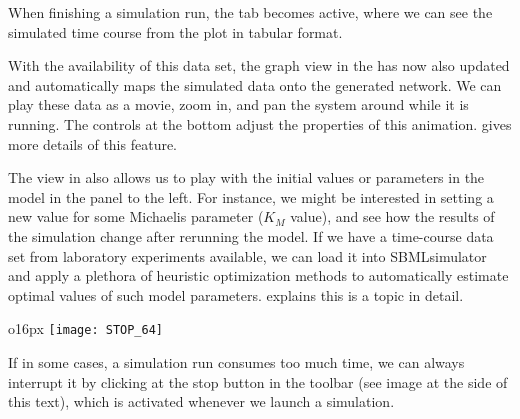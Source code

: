 When finishing a simulation run, the tab  becomes active, where we can see the simulated time course from the plot in tabular format.

With the availability of this data set, the graph view in the  has now also updated and automatically maps the simulated data onto the generated network.
We can play these data as a movie, zoom in, and pan the system around while it is running.
The controls at the bottom adjust the properties of this animation.
 gives more details of this feature.

The view in  also allows us to play with the initial values or parameters in the model in the panel to the left.
For instance, we might be interested in setting a new value for some Michaelis parameter ($K_M$ value), and see how the results of the simulation change after rerunning the model.
If we have a time-course data set from laboratory experiments available, we can load it into SBMLsimulator and apply a plethora of heuristic optimization methods to automatically estimate optimal values of such model parameters.
 explains this is a topic in detail.

\begin{wrapfigure}{o}{16px}
\vspace{\wrapfigspace}
\texttt{[image: STOP\_64]}
\end{wrapfigure}
If in some cases, a simulation run consumes too much time, we can always interrupt it by clicking at the stop button in the toolbar (see image at the side of this text), which is activated whenever we launch a simulation.

